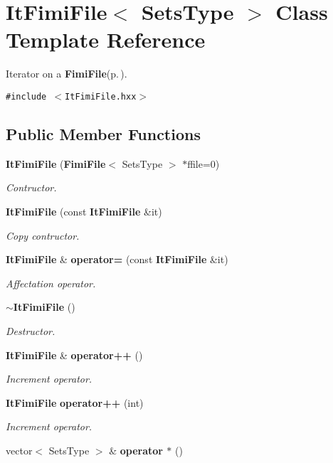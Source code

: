 \section{It\-Fimi\-File$<$ Sets\-Type $>$ Class Template Reference}
\label{class_it_fimi_file}
Iterator on a {\bf Fimi\-File}{\rm (p.\,\pageref{class_fimi_file})}.  


{\tt \#include $<$It\-Fimi\-File.hxx$>$}

\subsection*{Public Member Functions}
\begin{CompactItemize}
\item 
{\bf It\-Fimi\-File} ({\bf Fimi\-File}$<$ Sets\-Type $>$ $\ast$ffile=0)\label{class_it_fimi_file_e1f80f41516c1e0cc918f97e11b5e80d}

\begin{CompactList}\small\item\em Contructor. \item\end{CompactList}\item 
{\bf It\-Fimi\-File} (const {\bf It\-Fimi\-File} \&it)\label{class_it_fimi_file_c59e024aa9b426be7648fc2282b5a823}

\begin{CompactList}\small\item\em Copy contructor. \item\end{CompactList}\item 
{\bf It\-Fimi\-File} \& {\bf operator=} (const {\bf It\-Fimi\-File} \&it)\label{class_it_fimi_file_16c6213b3f03462beef7ba5d98e29975}

\begin{CompactList}\small\item\em Affectation operator. \item\end{CompactList}\item 
{\bf $\sim$It\-Fimi\-File} ()\label{class_it_fimi_file_c8d5eb337118f5d15a6ba67611641127}

\begin{CompactList}\small\item\em Destructor. \item\end{CompactList}\item 
{\bf It\-Fimi\-File} \& {\bf operator++} ()
\begin{CompactList}\small\item\em Increment operator. \item\end{CompactList}\item 
{\bf It\-Fimi\-File} {\bf operator++} (int)
\begin{CompactList}\small\item\em Increment operator. \item\end{CompactList}\item 
vector$<$ Sets\-Type $>$ \& {\bf operator $\ast$} ()\label{class_it_fimi_file_26e22a0dbc9b37fc0dd36b0a4fa1d0e0}


\end{CompactItemize}
